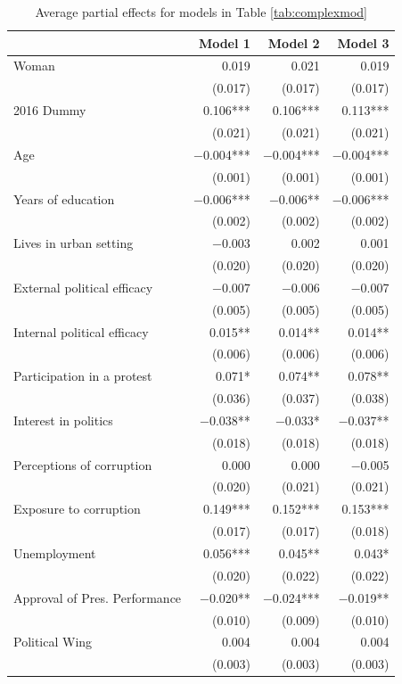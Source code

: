 \documentclass[floatsintext,man]{apa7}\usepackage[]{graphicx}\usepackage[]{color}
\begin{document}
\begin{table}[htbp]
\renewcommand{\arraystretch}{1}
\begin{center}
\caption{Average partial effects for models in Table \ref{tab:complexmod}}
\label{tab:apescomp}

\begin{tabular}[t]{lrrr}
\toprule
  & Model 1 & Model 2 & Model 3\\
\midrule
Woman & \num{0.019} & \num{0.021} & \num{0.019}\\
 & (\num{0.017}) & (\num{0.017}) & (\num{0.017})\\
2016 Dummy & \num{0.106}*** & \num{0.106}*** & \num{0.113}***\\
 & (\num{0.021}) & (\num{0.021}) & (\num{0.021})\\
Age & \num{-0.004}*** & \num{-0.004}*** & \num{-0.004}***\\
 & (\num{0.001}) & (\num{0.001}) & (\num{0.001})\\
Years of education & \num{-0.006}*** & \num{-0.006}** & \num{-0.006}***\\
 & (\num{0.002}) & (\num{0.002}) & (\num{0.002})\\
Lives in urban setting & \num{-0.003} & \num{0.002} & \num{0.001}\\
 & (\num{0.020}) & (\num{0.020}) & (\num{0.020})\\
External political efficacy & \num{-0.007} & \num{-0.006} & \num{-0.007}\\
 & (\num{0.005}) & (\num{0.005}) & (\num{0.005})\\
Internal political efficacy & \num{0.015}** & \num{0.014}** & \num{0.014}**\\
 & (\num{0.006}) & (\num{0.006}) & (\num{0.006})\\
Participation in a protest & \num{0.071}* & \num{0.074}** & \num{0.078}**\\
 & (\num{0.036}) & (\num{0.037}) & (\num{0.038})\\
Interest in politics & \num{-0.038}** & \num{-0.033}* & \num{-0.037}**\\
 & (\num{0.018}) & (\num{0.018}) & (\num{0.018})\\
Perceptions of corruption & \num{0.000} & \num{0.000} & \num{-0.005}\\
 & (\num{0.020}) & (\num{0.021}) & (\num{0.021})\\
Exposure to corruption & \num{0.149}*** & \num{0.152}*** & \num{0.153}***\\
 & (\num{0.017}) & (\num{0.017}) & (\num{0.018})\\
Unemployment & \num{0.056}*** & \num{0.045}** & \num{0.043}*\\
 & (\num{0.020}) & (\num{0.022}) & (\num{0.022})\\
Approval of Pres. Performance & \num{-0.020}** & \num{-0.024}*** & \num{-0.019}**\\
 & (\num{0.010}) & (\num{0.009}) & (\num{0.010})\\
Political Wing & \num{0.004} & \num{0.004} & \num{0.004}\\
 & (\num{0.003}) & (\num{0.003}) & (\num{0.003})\\
\bottomrule
\end{tabular}



\end{center}
\end{table}
\end{document}

